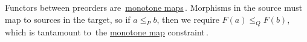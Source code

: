 Functors between preorders are \,\hyperref[D1.59]{monotone maps}\,. Morphisms in the source must map to sources in the target, so if $a \leq_P b$, then we require $F(a) \leq_Q F(b)$, which is tantamount to \,the \hyperref[D1.59]{monotone map} constraint\,.
